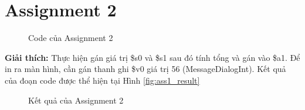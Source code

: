 \documentclass[a4paper,12pt]{article}
\begin{document}
\section{Assignment 2}
\begin{figure}[!h]
	\centerline{}
	\caption{Code của Assignment 2}
	\label{fig:ass2}
\end{figure}
\noindent
\textbf{Giải thích: }Thực hiện gán giá trị \$s0 và \$s1 sau đó tính tổng và gán vào \$a1. Để in ra màn hình, cần gán thanh ghi \$v0 giá trị 56 (MessageDialogInt). Kết quả của đoạn code được thể hiện tại Hình \ref{fig:ass1_result}
\begin{figure}[!h]
	\centerline{}
	\caption{Kết quả của Assignment 2}
	\label{fig:ass2_result}
\end{figure}	
\clearpage
\end{document}
